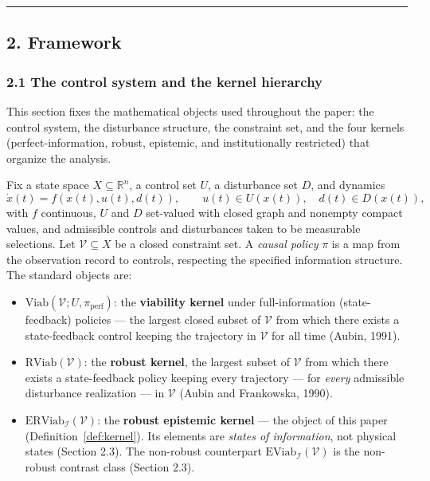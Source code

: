 \documentclass[11pt]{article}
\theoremstyle{definition}
\providecommand{\tightlist}{\setlength{\itemsep}{0pt}\setlength{\parskip}{0pt}}
\begin{document}
\begin{center}\rule{0.5\linewidth}{0.5pt}\end{center}

\subsection{2. Framework}\label{framework}

\subsubsection{2.1 The control system and the kernel
hierarchy}\label{the-control-system-and-the-kernel-hierarchy}

This section fixes the mathematical objects used throughout the paper:
the control system, the disturbance structure, the constraint set, and
the four kernels (perfect-information, robust, epistemic, and
institutionally restricted) that organize the analysis.

Fix a state space \(X \subseteq \mathbb{R}^n\), a control set \(U\), a
disturbance set \(D\), and dynamics
\[\dot x(t) = f(x(t), u(t), d(t)), \qquad u(t) \in U(x(t)), \quad d(t) \in D(x(t)),\]
with \(f\) continuous, \(U\) and \(D\) set-valued with closed graph and
nonempty compact values, and admissible controls and disturbances taken
to be measurable selections. Let \(\mathcal{V} \subseteq X\) be a closed
constraint set. A \emph{causal policy} \(\pi\) is a map from the
observation record to controls, respecting the specified information structure. The standard objects are:

\begin{itemize}
\tightlist
\item
  \(\mathrm{Viab}(\mathcal{V}; U, \pi_{\mathrm{perf}})\): the
  \textbf{viability kernel} under full-information (state-feedback)
  policies --- the largest closed subset of \(\mathcal{V}\) from which
  there exists a state-feedback control keeping the trajectory in
  \(\mathcal{V}\) for all time (Aubin, 1991).
\item
  \(\mathrm{RViab}(\mathcal{V})\): the \textbf{robust kernel}, the
  largest subset of \(\mathcal{V}\) from which there exists a
  state-feedback policy keeping every trajectory --- for \emph{every}
  admissible disturbance realization --- in \(\mathcal{V}\) (Aubin and
  Frankowska, 1990).
\item
  \(\mathrm{ERViab}_{\mathcal{I}}(\mathcal{V})\): the \textbf{robust
  epistemic kernel} --- the object of this paper (Definition~\ref{def:kernel}). Its
  elements are \emph{states of information}, not physical states
  (Section 2.3). The non-robust counterpart
  \(\mathrm{EViab}_{\mathcal{I}}(\mathcal{V})\) is the non-robust contrast class (Section 2.3).
\end{itemize}
\end{document}
